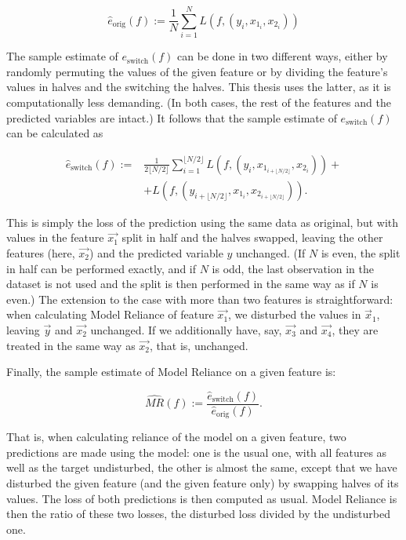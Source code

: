 		\begin{equation}
			\hat{e}_{\text{orig}}(f):= \frac{1}{N} \sum_{i=1}^{N} L\left(f, (y_i, x_{1_i}, x_{2_i}) \right)
		\end{equation} 
		
		The sample estimate of $e_{\text{switch}}(f)$ can be done in two different ways, either by randomly permuting the values of the given feature or by dividing the feature's values in halves and the switching the halves. This thesis uses the latter, as it is computationally less demanding. (In both cases, the rest of the features and the predicted variables are intact.) It follows that the sample estimate of $e_{\text{switch}}(f)$ can be calculated as
		
		
		\begin{equation}
			\begin{split}
				\hat{e}_{\text{switch}}(f):= & \frac{1}{2 \lfloor N/2 \rfloor} \sum_{i=1}^{\lfloor N/2 \rfloor} L \left(f, \left( y_i, x_{1_{i+\lfloor N/2 \rfloor}}, x_{2_{i}} \right) \right) + \\ 
				& + L \left( f, \left(y_{i+\lfloor N/2 \rfloor}, x_{1_{i}}, x_{2_{i+\lfloor N/2 \rfloor}} \right) \right). 
			\end{split}
		\end{equation}
		
		This is simply the loss of the prediction using the same data as original, but with values in the feature $\vec{x_1}$ split in half and the halves swapped, leaving the other features (here, $\vec{x_2}$) and the predicted variable $y$ unchanged. (If $N$ is even, the split in half can be performed exactly, and if $N$ is odd, the last observation in the dataset is not used and the split is then performed in the same way as if $N$ is even.) The extension to the case with more than two features is straightforward: when calculating Model Reliance of feature $\vec{x_1}$, we disturbed the values in $\vec{x}_1$, leaving $\vec{y}$ and $\vec{x_2}$ unchanged. If we additionally have, say, $\vec{x_3}$ and $\vec{x_4}$, they are treated in the same way as $\vec{x_2}$, that is, unchanged. 
		
		Finally, the sample estimate of Model Reliance on a given feature is: 
		
		\begin{equation}
			\widehat{MR}(f):=\frac{\hat{e}_{\text{switch}}(f)}{\hat{e}_{\text{orig}}(f)}.
		\end{equation}
			
		That is, when calculating reliance of the model on a given feature, two predictions are made using the model: one is the usual one, with all features as well as the target undisturbed, the other is almost the same, except that we have disturbed the given feature (and the given feature only) by swapping halves of its values. The loss of both predictions is then computed as usual. Model Reliance is then the ratio of these two losses, the disturbed loss divided by the undisturbed one.   
		
